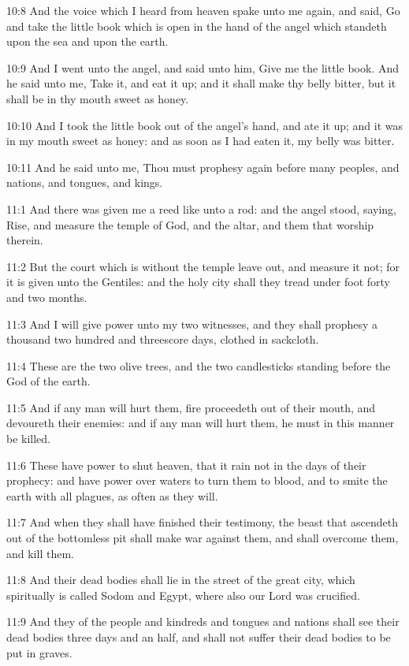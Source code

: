 10:8 And the voice which I heard from heaven spake unto me again, and said, Go and take the little book which is open in the hand of the angel which standeth upon the sea and upon the earth.

10:9 And I went unto the angel, and said unto him, Give me the little book. And he said unto me, Take it, and eat it up; and it shall make thy belly bitter, but it shall be in thy mouth sweet as honey.

10:10 And I took the little book out of the angel's hand, and ate it up; and it was in my mouth sweet as honey: and as soon as I had eaten it, my belly was bitter.

10:11 And he said unto me, Thou must prophesy again before many peoples, and nations, and tongues, and kings.

11:1 And there was given me a reed like unto a rod: and the angel stood, saying, Rise, and measure the temple of God, and the altar, and them that worship therein.

11:2 But the court which is without the temple leave out, and measure it not; for it is given unto the Gentiles: and the holy city shall they tread under foot forty and two months.

11:3 And I will give power unto my two witnesses, and they shall prophesy a thousand two hundred and threescore days, clothed in sackcloth.

11:4 These are the two olive trees, and the two candlesticks standing before the God of the earth.

11:5 And if any man will hurt them, fire proceedeth out of their mouth, and devoureth their enemies: and if any man will hurt them, he must in this manner be killed.

11:6 These have power to shut heaven, that it rain not in the days of their prophecy: and have power over waters to turn them to blood, and to smite the earth with all plagues, as often as they will.

11:7 And when they shall have finished their testimony, the beast that ascendeth out of the bottomless pit shall make war against them, and shall overcome them, and kill them.

11:8 And their dead bodies shall lie in the street of the great city, which spiritually is called Sodom and Egypt, where also our Lord was crucified.

11:9 And they of the people and kindreds and tongues and nations shall see their dead bodies three days and an half, and shall not suffer their dead bodies to be put in graves.

